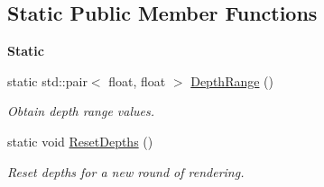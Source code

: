 \subsection*{Static Public Member Functions}
\begin{Indent}\textbf{ Static}\par
\begin{DoxyCompactItemize}
\item 
\mbox{\label{classrev_1_1_draw_command_abb12f1fdd934cd4f3e974e4b849cd242}} 
static std\+::pair$<$ float, float $>$ \mbox{\hyperlink{classrev_1_1_draw_command_abb12f1fdd934cd4f3e974e4b849cd242}{Depth\+Range}} ()
\begin{DoxyCompactList}\small\item\em Obtain depth range values. \end{DoxyCompactList}\item 
\mbox{\label{classrev_1_1_draw_command_af9dbb6cd2bbbad653544b8d664b7f7b1}} 
static void \mbox{\hyperlink{classrev_1_1_draw_command_af9dbb6cd2bbbad653544b8d664b7f7b1}{Reset\+Depths}} ()
\begin{DoxyCompactList}\small\item\em Reset depths for a new round of rendering. \end{DoxyCompactList}\end{DoxyCompactItemize}
\end{Indent}
